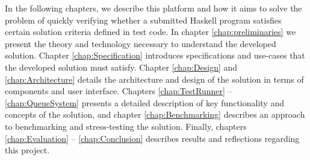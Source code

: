 In the following chapters, we describe this platform and how it aims to solve the problem of quickly verifying whether a submitted Haskell program satisfies certain solution criteria defined in test code.
In chapter \ref{chap:preliminaries} we present the theory and technology necessary to understand the developed solution.
Chapter \ref{chap:Specification} introduces specifications and use-cases that the developed solution must satisfy.
Chapter \ref{chap:Design} and \ref{chap:Architecture} details the architecture and design of the solution in terms of components and user interface.
Chapters \ref{chap:TestRunner} -- \ref{chap:QueueSystem} presents a detailed description of key functionality and concepts of the solution, and chapter \ref{chap:Benchmarking} describes an approach to benchmarking and stress-testing the solution.
Finally, chapters \ref{chap:Evaluation} -- \ref{chap:Conclusion} describes results and reflections regarding this project.

